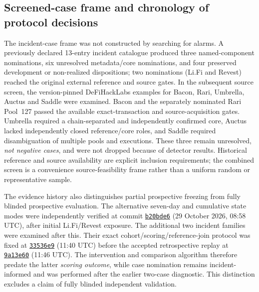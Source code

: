 \documentclass[preprint,12pt,authoryear]{elsarticle}
\begin{document}
\subsection{Screened-case frame and chronology of protocol decisions}
The incident-case frame was not constructed by searching for alarms. A previously declared 13-entry incident catalogue produced three named-component nominations, six unresolved metadata/core nominations, and four preserved development or non-realized dispositions; two nominations (Li.Fi and Revest) reached the original external reference and source gates. In the subsequent source screen, the version-pinned DeFiHackLabs examples for Bacon, Rari, Umbrella, Auctus and Saddle were examined. Bacon and the separately nominated Rari Pool~127 passed the available exact-transaction and source-acquisition gates. Umbrella required a chain-separated and independently confirmed core, Auctus lacked independently closed reference/core roles, and Saddle required disambiguation of multiple pools and executions. These three remain unresolved, \emph{not negative cases}, and were not dropped because of detector results. Historical reference and source availability are explicit inclusion requirements; the combined screen is a convenience source-feasibility frame rather than a uniform random or representative sample.

The evidence history also distinguishes partial prospective freezing from fully blinded prospective evaluation. The alternative seven-day and cumulative state modes were independently verified at commit \href{https://github.com/KuznetsovKarazin/blockchain-analytics-lab/commit/b20bde6f56c66dbee6aca2d02f14cd2ec4a16d50}{\texttt{b20bde6}} (29 October 2026, 08:58 UTC), after initial Li.Fi/Revest exposure. The additional two incident families were examined after this. Their exact cohort/scoring/reference-join protocol was fixed at \href{https://github.com/KuznetsovKarazin/blockchain-analytics-lab/commit/33536e915e5b4acded706823d592771621b13bb8}{\texttt{33536e9}} (11:40 UTC) before the accepted retrospective replay at \href{https://github.com/KuznetsovKarazin/blockchain-analytics-lab/commit/9a13e602cd6749aab920a568ac559d608a2c3fb6}{\texttt{9a13e60}} (11:46 UTC). The intervention and comparison algorithm therefore predate the latter \emph{scoring outcome}, while case nomination remains incident-informed and was performed after the earlier two-case diagnostic. This distinction excludes a claim of fully blinded independent validation.
\end{document}
